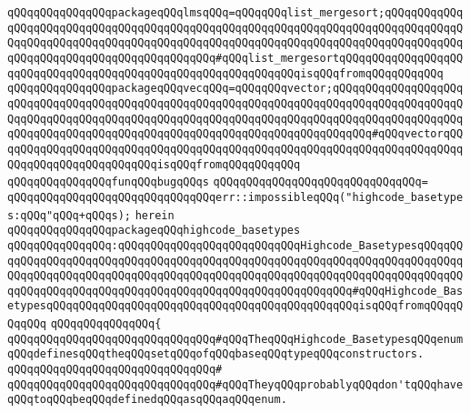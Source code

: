 \verb|qQQqqQQqqQQqqQQqpackageqQQqlmsqQQq=qQQqqQQqlist_mergesort;qQQqqQQqqQQqqQQqqQQqqQQqqQQqqQQqqQQqqQQqqQQqqQQqqQQqqQQqqQQqqQQqqQQqqQQqqQQqqQQqqQQqqQQqqQQqqQQqqQQqqQQqqQQqqQQqqQQqqQQqqQQqqQQqqQQqqQQqqQQqqQQqqQQqqQQqqQQqqQQqqQQqqQQqqQQqqQQqqQQqqQQq#qQQqlist_mergesortqQQqqQQqqQQqqQQqqQQqqQQqqQQqqQQqqQQqqQQqqQQqqQQqqQQqqQQqqQQqqQQqisqQQqfromqQQqqQQqqQQq|\newline
\verb|qQQqqQQqqQQqqQQqpackageqQQqvecqQQq=qQQqqQQqvector;qQQqqQQqqQQqqQQqqQQqqQQqqQQqqQQqqQQqqQQqqQQqqQQqqQQqqQQqqQQqqQQqqQQqqQQqqQQqqQQqqQQqqQQqqQQqqQQqqQQqqQQqqQQqqQQqqQQqqQQqqQQqqQQqqQQqqQQqqQQqqQQqqQQqqQQqqQQqqQQqqQQqqQQqqQQqqQQqqQQqqQQqqQQqqQQqqQQqqQQqqQQqqQQqqQQqqQQq#qQQqvectorqQQqqQQqqQQqqQQqqQQqqQQqqQQqqQQqqQQqqQQqqQQqqQQqqQQqqQQqqQQqqQQqqQQqqQQqqQQqqQQqqQQqqQQqqQQqqQQqisqQQqfromqQQqqQQqqQQq|\newline
\newline
\verb|qQQqqQQqqQQqqQQqfunqQQqbugqQQqs|\newline
\verb|qQQqqQQqqQQqqQQqqQQqqQQqqQQqqQQq=|\newline
\verb|qQQqqQQqqQQqqQQqqQQqqQQqqQQqqQQqerr::impossibleqQQq("highcode_basetypes:qQQq"qQQq+qQQqs);|\newline
\newline
\verb|herein|\newline
\newline
\verb|qQQqqQQqqQQqqQQqpackageqQQqhighcode_basetypes|\newline
\verb|qQQqqQQqqQQqqQQq:qQQqqQQqqQQqqQQqqQQqqQQqqQQqHighcode_BasetypesqQQqqQQqqQQqqQQqqQQqqQQqqQQqqQQqqQQqqQQqqQQqqQQqqQQqqQQqqQQqqQQqqQQqqQQqqQQqqQQqqQQqqQQqqQQqqQQqqQQqqQQqqQQqqQQqqQQqqQQqqQQqqQQqqQQqqQQqqQQqqQQqqQQqqQQqqQQqqQQqqQQqqQQqqQQqqQQqqQQqqQQqqQQqqQQqqQQqqQQq#qQQqHighcode_BasetypesqQQqqQQqqQQqqQQqqQQqqQQqqQQqqQQqqQQqqQQqqQQqqQQqisqQQqfromqQQqqQQqqQQq|\newline
\verb|qQQqqQQqqQQqqQQq{|\newline
\newline
\verb|qQQqqQQqqQQqqQQqqQQqqQQqqQQqqQQq#qQQqTheqQQqHighcode_BasetypesqQQqenumqQQqdefinesqQQqtheqQQqsetqQQqofqQQqbaseqQQqtypeqQQqconstructors.|\newline
\verb|qQQqqQQqqQQqqQQqqQQqqQQqqQQqqQQq#|\newline
\verb|qQQqqQQqqQQqqQQqqQQqqQQqqQQqqQQq#qQQqTheyqQQqprobablyqQQqdon'tqQQqhaveqQQqtoqQQqbeqQQqdefinedqQQqasqQQqaqQQqenum.|\newline
